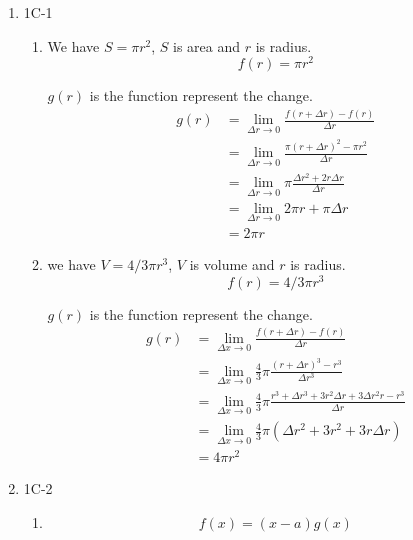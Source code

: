 \documentclass{article}
\begin{document}
\begin{enumerate}
\item 1C-1
    \begin{enumerate}
        \item We have $S = \pi r^2$, $S$ is area and $r$ is radius.
        \begin{equation*}
            f(r) = \pi  r^2
         \end{equation*}
        
        $g(r)$ is the function represent the change.
        \begin{align*}
            g(r) &= \lim_{\Delta r \to 0} \frac{f(r + \Delta r) - f(r)}{\Delta r} \\
            &= \lim_{\Delta r \to 0} \frac{\pi  (r + \Delta r) ^ 2 - \pi r ^ 2}{\Delta r} \\
            &= \lim_{\Delta r \to 0} \pi \frac{ \Delta r ^ 2 + 2 r \Delta r}{\Delta r} \\
            &= \lim_{\Delta r \to 0} 2 \pi r + \pi \Delta r \\
            &= 2 \pi r 
         \end{align*}
         \item we have $V = 4/3 \pi r ^ 3$, $V$ is volume and $r$ is radius.
         \begin{equation*}
            f(r) = 4/3 \pi r ^ 3
         \end{equation*}
        
        $g(r)$ is the function represent the change.
        \begin{align*}
            g(r) &= \lim_{\Delta x \to 0} \frac{f(r + \Delta r) - f(r)}{\Delta r} \\
            &= \lim_{\Delta x \to 0} \frac{4}{3} \pi \frac{(r + \Delta r) ^ 3 - r ^ 3}{\Delta r ^ 3} \\
            &= \lim_{\Delta x \to 0} \frac{4}{3} \pi \frac{r^3  + \Delta r^3 + 3r^2 \Delta r + 3 \Delta r^2r - r ^ 3}{\Delta r} \\
            &= \lim_{\Delta x \to 0} \frac{4}{3} \pi (\Delta r^2 + 3r^2 + 3r \Delta r ) \\
            &= 4 \pi r^2
        \end{align*}
    \end{enumerate}    
\item 1C-2
    \begin{enumerate}
    \item 
    \begin{equation*}
        f(x) = (x-a)g(x)
    \end{equation*}


\end{enumerate}
\end{enumerate}
\end{document}
